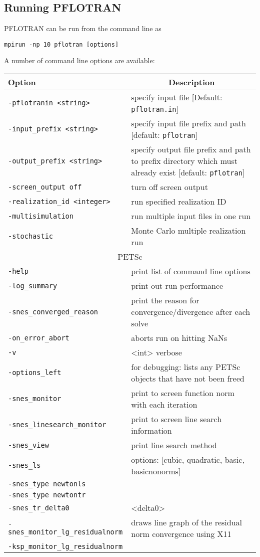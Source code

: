 \normalsize

\newpage
\subsection{Running PFLOTRAN}

PFLOTRAN can be run from the command line as

\verb|mpirun -np 10 pflotran [options]|

A number of command line options are available:

\begin{tabular}{lp{8cm}}
\toprule
Option & \multicolumn{1}{c}{Description}\\
\midrule
{\tt -pflotranin <string>} & specify input file [Default: {\tt pflotran.in}]\\
{\tt -input\_prefix <string>} & specify input file prefix and path [default: {\tt pflotran}]\\
{\tt -output\_prefix <string>} & specify output file prefix and path to prefix directory which must already exist [default: {\tt pflotran}]\\
{\tt -screen\_output off} & turn off screen output\\
{\tt -realization\_id <integer>} & run specified realization ID\\
{\tt -multisimulation} & run multiple input files in one run\\
{\tt -stochastic} & Monte Carlo multiple realization run\\
\midrule
\multicolumn{2}{c}{PETSc}\\
\midrule
{\tt -help} & print list of command line options\\
{\tt -log\_summary} & print out run performance\\
{\tt -snes\_converged\_reason} & print the reason for convergence/divergence after each solve\\
{\tt -on\_error\_abort} & aborts run on hitting NaNs\\
{\tt -v} & <int> verbose\\
{\tt -options\_left} & for debugging: lists any PETSc objects that have not been freed\\
{\tt -snes\_monitor} & print to screen function norm with each iteration\\
{\tt -snes\_linesearch\_monitor} & print to screen line search information\\
{\tt -snes\_view} & print line search method\\
{\tt -snes\_ls} & options: [cubic, quadratic, basic, basicnonorms] \\
{\tt -snes\_type newtonls} & \\
{\tt -snes\_type newtontr} & \\
{\tt -snes\_tr\_delta0} & <delta0>\\
{\tt -snes\_monitor\_lg\_residualnorm} & draws line graph of the residual norm convergence using X11\\
{\tt -ksp\_monitor\_lg\_residualnorm} & \\
\bottomrule
\end{tabular}

